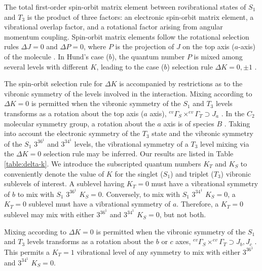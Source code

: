 \documentclass[12pt]{mitthesis}
\begin{document}
The total first-order spin-orbit matrix element between rovibrational
states of $S_1$ and $T_3$ is the product of three factors: an
electronic spin-orbit matrix element, a vibrational overlap factor,
and a rotational factor arising from angular momentum coupling.
Spin-orbit matrix elements follow the rotational selection rules
$\Delta J = 0$ and $\Delta P = 0$, where $P$ is the projection of $J$
on the top axis ($a$-axis) of the molecule \cite{hougen64}.  In Hund's
case ($b$), the quantum number $P$ is mixed among several levels with
different $K$, leading to the case ($b$) selection rule $\Delta K = 0,
\pm 1$ \cite{hougen64, stevens73}.

The spin-orbit selection rule for $\Delta K$ is accompanied by
restrictions as to the vibronic symmetry of the levels involved in the
interaction.  Mixing according to $\Delta K =0$ is permitted when the
vibronic symmetry of the $S_1$ and $T_3$ levels transforms as a
rotation about the top axis ($a$ axis), $^{ev}\Gamma_S \times
^{ev}\Gamma_T \supset J_a$ \cite{stevens73}.  In the $C_2$ molecular
symmetry group, a rotation about the $a$ axis is of species $B$
\cite{bunker98}.  Taking into account the electronic symmetry of the
$T_3$ state and the vibronic symmetry of the $S_1$ $3^36^1$ and
$3^34^1$ levels, the vibrational symmetry of a $T_3$ level mixing via
the $\Delta K=0$ selection rule may be inferred.  Our results are
listed in Table \ref{table:delta-k}.  We introduce the subscripted
quantum numbers $K_T$ and $K_S$ to conveniently denote the value of
$K$ for the singlet ($S_1$) and triplet ($T_3$) vibronic sublevels of
interest.  A sublevel having $K_T=0$ must have a vibrational symmetry
of $b$ to mix with $S_1$ $3^36^1$ $K_S=0$.  Conversely, to mix with
$S_1$ $3^34^1$ $K_S=0$, a $K_T=0$ sublevel must have a vibrational
symmetry of $a$.  Therefore, a $K_T=0$ sublevel may mix with either
$3^36^1$ and $3^34^1$ $K_S=0$, but not both.

Mixing according to $\Delta K =0$ is permitted when the vibronic
symmetry of the $S_1$ and $T_3$ levels transforms as a rotation about
the $b$ or $c$ axes, $^{ev}\Gamma_S \times ^{ev}\Gamma_T \supset J_b,
J_c$ \cite{stevens73}.  This permits a $K_T=1$ vibrational level of any
symmetry to mix with either $3^36^1$ and $3^34^1$ $K_S=0$.
\end{document}
